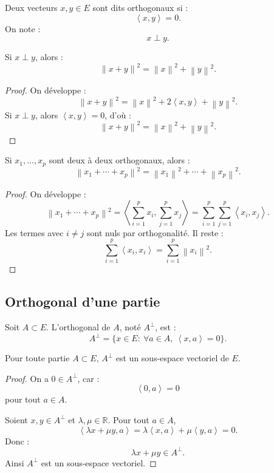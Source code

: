 \documentclass[11pt,a4paper]{article}
\newcommand{\R}{\mathbb R}
\newcommand{\norme}[1]{\left\lVert #1\right\rVert}
\newcommand{\scal}[2]{\left\langle #1,#2\right\rangle}
\begin{document}
\begin{definitionbox}[Orthogonalité]
Deux vecteurs \(x,y\in E\) sont dits orthogonaux si :
\[
\scal{x}{y}=0.
\]
On note :
\[
x\perp y.
\]
\end{definitionbox}

\begin{theorembox}[Pythagore]
Si \(x\perp y\), alors :
\[
\norme{x+y}^2=\norme{x}^2+\norme{y}^2.
\]
\end{theorembox}

\begin{proof}
On développe :
\[
\norme{x+y}^2
=
\norme{x}^2+2\scal{x}{y}+\norme{y}^2.
\]
Si \(x\perp y\), alors \(\scal{x}{y}=0\), d'où :
\[
\norme{x+y}^2=\norme{x}^2+\norme{y}^2.
\]
\end{proof}

\begin{theorembox}
Si \(x_1,\dots,x_p\) sont deux à deux orthogonaux, alors :
\[
\norme{x_1+\cdots+x_p}^2
=
\norme{x_1}^2+\cdots+\norme{x_p}^2.
\]
\end{theorembox}

\begin{proof}
On développe :
\[
\norme{x_1+\cdots+x_p}^2
=
\scal{\sum_{i=1}^p x_i}{\sum_{j=1}^p x_j}
=
\sum_{i=1}^p\sum_{j=1}^p\scal{x_i}{x_j}.
\]
Les termes avec \(i\neq j\) sont nuls par orthogonalité.  
Il reste :
\[
\sum_{i=1}^p\scal{x_i}{x_i}
=
\sum_{i=1}^p\norme{x_i}^2.
\]
\end{proof}

\subsection{Orthogonal d'une partie}

\begin{definitionbox}
Soit \(A\subset E\).  
L'orthogonal de \(A\), noté \(A^\perp\), est :
\[
A^\perp=\{x\in E:\ \forall a\in A,\ \scal{x}{a}=0\}.
\]
\end{definitionbox}

\begin{theorembox}
Pour toute partie \(A\subset E\), \(A^\perp\) est un sous-espace vectoriel de \(E\).
\end{theorembox}

\begin{proof}
On a \(0\in A^\perp\), car :
\[
\scal{0}{a}=0
\]
pour tout \(a\in A\).

Soient \(x,y\in A^\perp\) et \(\lambda,\mu\in\R\).  
Pour tout \(a\in A\),
\[
\scal{\lambda x+\mu y}{a}
=
\lambda\scal{x}{a}+\mu\scal{y}{a}
=
0.
\]
Donc :
\[
\lambda x+\mu y\in A^\perp.
\]
Ainsi \(A^\perp\) est un sous-espace vectoriel.
\end{proof}
\end{document}
